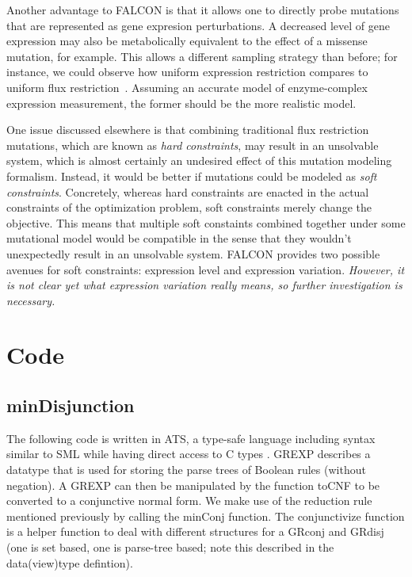 \documentclass[phd,tocprelim]{cornell}
\theoremstyle{break}
\theoremstyle{empty}
\begin{document}
Another advantage to FALCON is that it allows one to directly probe mutations that are represented as gene expresion
perturbations. A decreased level of gene expression may also be metabolically equivalent to the effect of a missense
mutation, for example. This allows a different sampling strategy than before; for instance, we could observe how uniform 
expression restriction compares to uniform flux restriction~\cite{Xu2012}. Assuming an accurate model of enzyme-complex
expression measurement, the former should be the more realistic model.

One issue discussed elsewhere is that combining traditional flux restriction mutations, which are known as 
\emph{hard constraints}, may result in an unsolvable system, which is almost certainly an undesired effect
of this mutation modeling formalism. Instead, it would be better if mutations could be modeled as 
\emph{soft constraints}. Concretely, whereas hard constraints are enacted in the actual constraints of the 
optimization problem, soft constraints merely change the objective. This means that multiple soft constaints
combined together under some mutational model would be compatible in the sense that they wouldn't unexpectedly
result in an unsolvable system. FALCON provides two possible avenues for soft constraints: expression level 
and expression variation. \emph{However, it is not clear yet what expression variation really means, so further
investigation is necessary.}

\section{Code}
\subsection{minDisjunction}

The following code is written in ATS, a type-safe language including syntax similar to SML while
having direct access to C types \cite{ATStypes03}.
GREXP describes a datatype that is used for storing the parse trees of Boolean rules (without negation).
A GREXP can then be manipulated by the function toCNF to be converted to a conjunctive normal form.
We make use of the reduction rule mentioned previously by calling the minConj function. The 
conjunctivize function is a helper function to deal with different structures for a GRconj
and GRdisj (one is set based, one is parse-tree based; note this described in the data(view)type defintion).
\end{document}
